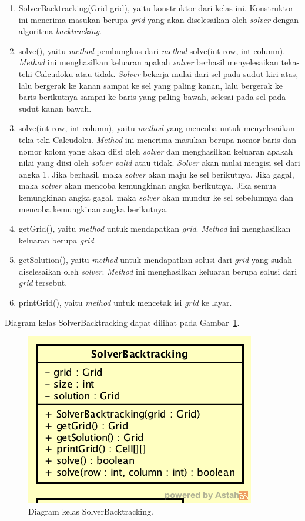 \begin{enumerate}
\item SolverBacktracking(Grid grid), yaitu konstruktor dari kelas ini. Konstruktor ini menerima masukan berupa \textit{grid} yang akan diselesaikan oleh \textit{solver} dengan algoritma \textit{backtracking}.
\item solve(), yaitu \textit{method} pembungkus dari \textit{method} solve(int row, int column). \textit{Method} ini menghasilkan keluaran apakah \textit{solver} berhasil menyelesaikan teka-teki Calcudoku atau tidak. \textit{Solver} bekerja mulai dari sel pada sudut kiri atas, lalu bergerak ke kanan sampai ke sel yang paling kanan, lalu bergerak ke baris berikutnya sampai ke baris yang paling bawah, selesai pada sel pada sudut kanan bawah.
\item solve(int row, int column), yaitu \textit{method} yang mencoba untuk menyelesaikan teka-teki Calcudoku. \textit{Method} ini menerima masukan berupa nomor baris dan nomor kolom yang akan diisi oleh \textit{solver} dan menghasilkan keluaran apakah nilai yang diisi oleh \textit{solver valid} atau tidak. \textit{Solver} akan mulai mengisi sel dari angka 1. Jika berhasil, maka \textit{solver} akan maju ke sel berikutnya. Jika gagal, maka \textit{solver} akan mencoba kemungkinan angka berikutnya. Jika semua kemungkinan angka gagal, maka \textit{solver} akan mundur ke sel sebelumnya dan mencoba kemungkinan angka berikutnya.
\item getGrid(), yaitu \textit{method} untuk mendapatkan \textit{grid}. \textit{Method} ini menghasilkan keluaran berupa \textit{grid}.
\item getSolution(), yaitu \textit{method} untuk mendapatkan solusi dari \textit{grid} yang sudah diselesaikan oleh \textit{solver}. \textit{Method} ini menghasilkan keluaran berupa solusi dari \textit{grid} tersebut.
\item printGrid(), yaitu \textit{method} untuk mencetak isi \textit{grid} ke layar.
\end{enumerate}

Diagram kelas SolverBacktracking dapat dilihat pada Gambar~\ref{fig:diagramkelassolverbt}.

\begin{figure}
\centering
\captionsetup{justification=centering}
\includegraphics[scale=0.5]{Gambar/Perancangan/DiagramKelasSolverBacktracking.png}
\caption[Diagram kelas SolverBacktracking.]{Diagram kelas SolverBacktracking.}
\label{fig:diagramkelassolverbt}
\end{figure}

